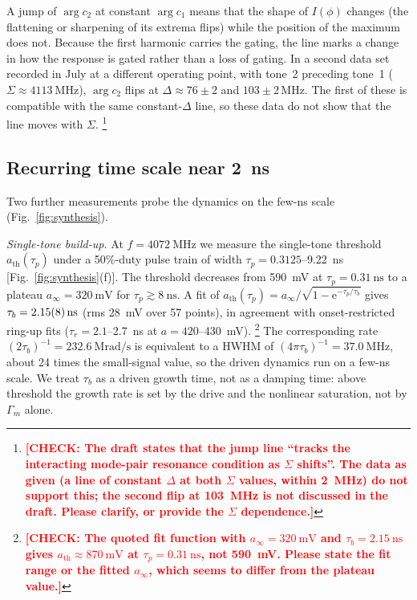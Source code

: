 \documentclass[aps,prb,reprint,superscriptaddress,floatfix]{revtex4-2}
\newcommand{\chk}[1]{\textcolor{red}{\textbf{[CHECK: #1]}}}
\newcommand{\chk}[1]{}
\newcommand{\ee}{\mathrm{e}}
\begin{document}
A jump of $\arg c_2$ at constant $\arg c_1$ means that the shape of $I(\phi)$ changes (the flattening or sharpening of its extrema flips) while the position of the maximum does not. Because the first harmonic carries the gating, the line marks a change in how the response is gated rather than a loss of gating. In a second data set recorded in July at a different operating point, with tone~2 preceding tone~1 ($\Sigma\approx\SI{4113}{\mega\hertz}$), $\arg c_2$ flips at $\Delta\approx76\pm2$ and $103\pm2$\,MHz. The first of these is compatible with the same constant-$\Delta$ line, so these data do not show that the line moves with $\Sigma$.%
\footnote{\chk{The draft states that the jump line ``tracks the interacting mode-pair resonance condition as $\Sigma$ shifts''. The data as given (a line of constant $\Delta$ at both $\Sigma$ values, within \SI{2}{\mega\hertz}) do not support this; the second flip at \SI{103}{\mega\hertz} is not discussed in the draft. Please clarify, or provide the $\Sigma$ dependence.}}

\subsection{Recurring time scale near \SI{2}{\nano\second}}\label{sec:timescales}

Two further measurements probe the dynamics on the few-ns scale (Fig.~\ref{fig:synthesis}).

\emph{Single-tone build-up.} At $f=\SI{4072}{\mega\hertz}$ we measure the single-tone threshold $a_{\mathrm{th}}(\tau_p)$ under a 50\%-duty pulse train of width $\tau_p=0.3125$--\SI{9.22}{\nano\second} [Fig.~\ref{fig:synthesis}(f)]. The threshold decreases from \SI{590}{\milli\volt} at $\tau_p=\SI{0.31}{\nano\second}$ to a plateau $a_\infty=\SI{320}{\milli\volt}$ for $\tau_p\gtrsim\SI{8}{\nano\second}$. A fit of $a_{\mathrm{th}}(\tau_p)=a_\infty/\sqrt{1-\ee^{-\tau_p/\tau_b}}$ gives $\tau_b=\SI{2.15+-0.08}{\nano\second}$ (rms \SI{28}{\milli\volt} over 57 points), in agreement with onset-restricted ring-up fits ($\tau_r=2.1$--\SI{2.7}{\nano\second} at $a=420$--\SI{430}{\milli\volt}).%
\footnote{\chk{The quoted fit function with $a_\infty=\SI{320}{\milli\volt}$ and $\tau_b=\SI{2.15}{\nano\second}$ gives $a_{\mathrm{th}}\approx\SI{870}{\milli\volt}$ at $\tau_p=\SI{0.31}{\nano\second}$, not \SI{590}{\milli\volt}. Please state the fit range or the fitted $a_\infty$, which seems to differ from the plateau value.}}
The corresponding rate $(2\tau_b)^{-1}=\SI{232.6}{\mega\radian\per\second}$ is equivalent to a HWHM of $(4\pi\tau_b)^{-1}=\SI{37.0}{\mega\hertz}$, about 24 times the small-signal value, so the driven dynamics run on a few-ns scale. We treat $\tau_b$ as a driven growth time, not as a damping time: above threshold the growth rate is set by the drive and the nonlinear saturation, not by $\Gamma_m$ alone.
\end{document}
